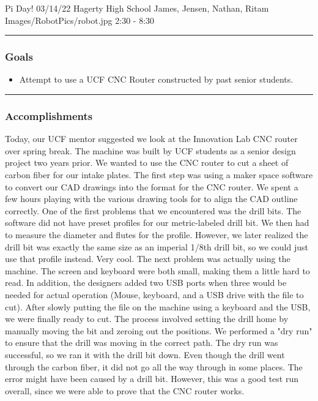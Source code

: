 \insertmeeting 
	{Pi Day!} 
	{03/14/22} 
	{Hagerty High School}
	{James, Jensen, Nathan, Ritam}
	{Images/RobotPics/robot.jpg}
	{2:30 - 8:30}
	
\noindent\hfil\rule{\textwidth}{.4pt}\hfil
\subsubsection*{Goals}
\begin{itemize}
    \item Attempt to use a UCF CNC Router constructed by past senior students. 

\end{itemize} 

\noindent\hfil\rule{\textwidth}{.4pt}\hfil

\subsubsection*{Accomplishments}
Today, our UCF mentor suggested we look at the Innovation Lab CNC router over spring break. The machine was built by UCF students as a senior design project two years prior. We wanted to use the CNC router to cut a sheet of carbon fiber for our intake plates. The first step was using a maker space software to convert our CAD drawings into the format for the CNC router. We spent a few hours playing with the various drawing tools for to align the CAD outline correctly. One of the first problems that we encountered was the drill bits. The software did not have preset profiles for our metric-labeled drill bit. We then had to measure the diameter and flutes for the profile. However, we later realized the drill bit was exactly the same size as an imperial 1/8th drill bit, so we could just use that profile instead. Very cool. The next problem was actually using the machine. The screen and keyboard were both small, making them a little hard to read. In addition, the designers added two USB ports when three would be needed for actual operation (Mouse, keyboard, and a USB drive with the file to cut). After slowly putting the file on the machine using a keyboard and the USB, we were finally ready to cut. The process involved setting the drill home by manually moving the bit and zeroing out the positions. We performed a "dry run" to ensure that the drill was moving in the correct path. The dry run was successful, so we ran it with the drill bit down. Even though the drill went through the carbon fiber, it did not go all the way through in some places. The error might have been caused by a drill bit. However, this was a good test run overall, since we were able to prove that the CNC router works. 




